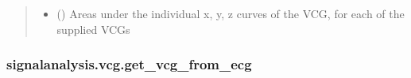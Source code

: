 \documentclass[letterpaper,10pt,english]{sphinxmanual}
\begin{document}
\begin{fulllineitems}
\begin{quote}
\begin{description}
\begin{itemize}
\item {} 
\sphinxAtStartPar
{} () \textendash{} Areas under the individual x, y, z curves of the VCG, for each of the supplied VCGs

\end{itemize}


\end{description}\end{quote}

\end{fulllineitems}



\subsubsection{signalanalysis.vcg.get\_vcg\_from\_ecg}
\label{\detokenize{_autosummary/signalanalysis.vcg.get_vcg_from_ecg:signalanalysis-vcg-get-vcg-from-ecg}}\label{\detokenize{_autosummary/signalanalysis.vcg.get_vcg_from_ecg::doc}}
\end{document}
